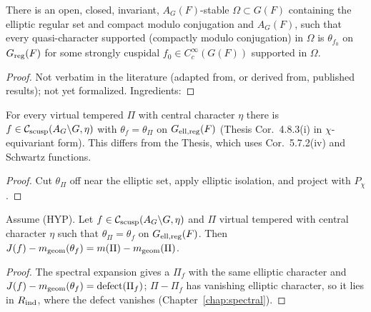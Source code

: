 \begin{theorem}
\label{bp_scusp_surj_ell}
\leanok
{}
There is an open, closed, invariant, $A_G(F)$-stable $\Omega\subset G(F)$ containing the elliptic regular set
and compact modulo conjugation and $A_G(F)$, such that every quasi-character supported (compactly
modulo conjugation) in $\Omega$ is $\theta_{f_0}$ on $G_{\mathrm{reg}}(F)$ for some strongly cuspidal $f_0\in C_c^\infty(G(F))$
supported in $\Omega$.
\end{theorem}
\begin{proof}
Not verbatim in the literature (adapted from, or derived from, published results); not yet formalized. Ingredients: 
\end{proof}

\begin{proposition}
\label{exists_scusp_ell}
\leanok
{}
For every virtual tempered $\Pi$ with central character $\eta$ there is $f\in\mathcal{C}_{\mathrm{scusp}}(A_G\backslash G,\eta)$ with
$\theta_f=\theta_\Pi$ on $G_{\mathrm{ell,reg}}(F)$ (Thesis Cor.~4.8.3(i) in $\chi$-equivariant form).
This differs from the Thesis, which uses \cite{BP} Cor.~5.7.2(iv) and Schwartz functions.
\end{proposition}
\begin{proof}
\leanok
{}
Cut $\theta_\Pi$ off near the elliptic set, apply elliptic isolation, and project with $P_\chi$.
\end{proof}

\begin{proposition}
\label{prop_11_5_1_ii_ell}
\leanok
{}
Assume (HYP). Let $f\in\mathcal{C}_{\mathrm{scusp}}(A_G\backslash G,\eta)$ and $\Pi$ virtual tempered with central character $\eta$ such
that $\theta_\Pi=\theta_f$ on $G_{\mathrm{ell,reg}}(F)$. Then $J(f)-m_{\mathrm{geom}}(\theta_f)=m(\Pi)-m_{\mathrm{geom}}(\Pi)$.
\end{proposition}
\begin{proof}
\leanok
{}
The spectral expansion gives a $\Pi_f$ with the same elliptic character and
$J(f)-m_{\mathrm{geom}}(\theta_f)=\mathrm{defect}(\Pi_f)$; $\Pi-\Pi_f$ has vanishing elliptic character, so it lies in $R_{\mathrm{ind}}$,
where the defect vanishes (Chapter~\ref{chap:spectral}).
\end{proof}

